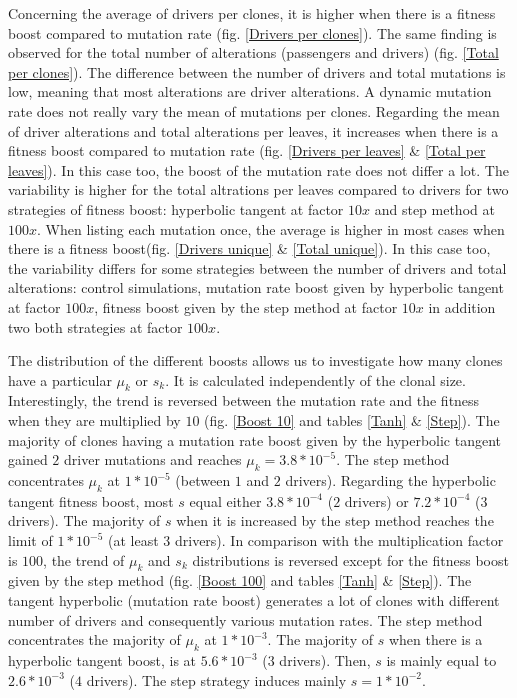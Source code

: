 \documentclass[a4paper]{article}
\begin{document}
\begin{multicols}{2}
Concerning the average of drivers per clones, it is higher when there is a fitness boost compared to mutation rate (fig. \ref{Drivers per clones}). The same finding is observed for the total number of alterations (passengers and drivers) (fig. \ref{Total per clones}). The difference between the number of drivers and total mutations is low, meaning that most alterations are driver alterations. A dynamic mutation rate does not really vary the mean of mutations per clones. Regarding the mean of driver alterations and total alterations per leaves, it increases when there is a fitness boost compared to mutation rate (fig. \ref{Drivers per leaves} \& \ref{Total per leaves}). In this case too, the boost of the mutation rate does not differ a lot. The variability is higher for the total altrations per leaves compared to drivers for two strategies of fitness boost: hyperbolic tangent at factor $10x$ and step method at $100x$. When listing each mutation once, the average is higher in most cases when there is a fitness boost(fig. \ref{Drivers unique} \& \ref{Total unique}). In this case too, the variability differs for some strategies between the number of drivers and total alterations: control simulations, mutation rate boost given by hyperbolic tangent at factor $100x$, fitness boost given by the step method at factor $10x$ in addition two both strategies at factor $100x$.
 
 
The distribution of the different boosts allows us to investigate how many clones have a particular $\mu_k$ or $s_k$. It is calculated independently of the clonal size. Interestingly, the trend is reversed between the mutation rate and the fitness when they are multiplied by $10$ (fig. \ref{Boost 10} and tables \ref{Tanh} \& \ref{Step}). The majority of clones having a mutation rate boost given by the hyperbolic tangent gained $2$ driver mutations and reaches $\mu_k=3.8*10^{-5}$. The step method concentrates $\mu_k$ at $1*10^{-5}$ (between $1$ and $2$ drivers). Regarding the hyperbolic tangent fitness boost, most $s$ equal either $3.8*10^{-4}$ ($2$ drivers) or $7.2*10^{-4}$ ($3$ drivers). The majority of $s$ when it is increased by the step method reaches the limit of $1*10^{-5}$ (at least $3$ drivers). In comparison with the multiplication factor is $100$, the trend of $\mu_k$ and $s_k$ distributions is reversed except for the fitness boost given by the step method (fig. \ref{Boost 100} and tables \ref{Tanh} \& \ref{Step}). The tangent hyperbolic (mutation rate boost) generates a lot of clones with different number of drivers and consequently various mutation rates. The step method concentrates the majority of $\mu_k$ at $1*10^{-3}$. The majority of $s$ when there is a hyperbolic tangent boost, is at $5.6*10^{-3}$ ($3$ drivers). Then, $s$ is mainly equal to $2.6*10^{-3}$ ($4$ drivers). The step strategy induces mainly $s=1*10^{-2}$.






\end{multicols}
\end{document}
